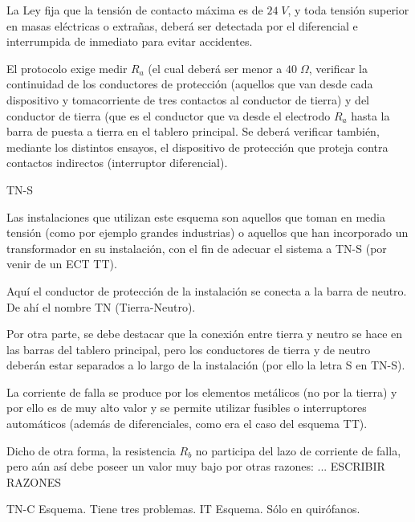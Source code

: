 La Ley fija que la tensión de contacto máxima es de $24\; V$, y toda tensión superior en masas eléctricas o extrañas, deberá ser detectada por el diferencial e interrumpida de inmediato para evitar accidentes.

El protocolo exige medir $R_a$ (el cual deberá ser menor a $40\; \Omega$, verificar la continuidad de los conductores de protección (aquellos que van desde cada dispositivo y tomacorriente de tres contactos al conductor de tierra) y del conductor de tierra (que es el conductor que va desde el electrodo $R_a$ hasta la barra de puesta a tierra en el tablero principal. Se deberá verificar también, mediante los distintos ensayos, el dispositivo de protección que proteja contra contactos indirectos (interruptor diferencial). 

TN-S

Las instalaciones que utilizan este esquema son aquellos que toman en media tensión (como por ejemplo grandes industrias) o aquellos que han incorporado un transformador en su instalación, con el fin de adecuar el sistema a TN-S (por venir de un ECT TT).

Aquí el conductor de protección de la instalación se conecta a la barra de neutro. De ahí el nombre TN (Tierra-Neutro).

Por otra parte, se debe destacar que la conexión entre tierra y neutro se hace en las barras del tablero principal, pero los conductores de tierra y de neutro deberán estar separados a lo largo de la instalación (por ello la letra S en TN-S).

La corriente de falla se produce por los elementos metálicos (no por la tierra) y por ello es de muy alto valor y se permite utilizar fusibles o interruptores automáticos (además de diferenciales, como era el caso del esquema TT).

Dicho de otra forma, la resistencia $R_b$ no participa del lazo de corriente de falla, pero aún así debe poseer un valor muy bajo por otras razones: ... ESCRIBIR RAZONES


TN-C
Esquema.
Tiene tres problemas.
IT
Esquema.
Sólo en quirófanos.